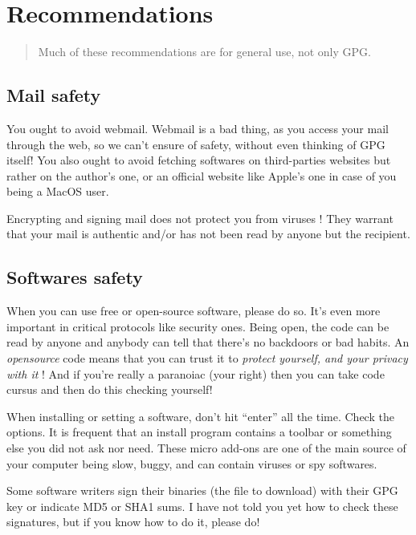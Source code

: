 \section{Recommendations}\label{recommendations}

\begin{quote}
Much of these recommendations are for general use, not only GPG.
\end{quote}

\subsection{Mail safety}

You ought to avoid webmail. Webmail is a bad thing, as you access your mail through the web, so we can't ensure of safety, without even
thinking of GPG itself! You also ought to avoid fetching softwares on third-parties websites but rather on the author's one, or an official website like Apple's one in case of you being a MacOS user.

Encrypting and signing mail does not protect you from viruses ! They
warrant that your mail is authentic and/or has not been read by anyone
but the recipient.

\subsection{Softwares safety}

When you can use free or open-source software, please do so. It's even more important in critical protocols like security ones. Being open, the code can be read by anyone and anybody can tell that there's no backdoors or bad habits. An \emph{opensource} code means that you can trust it to \emph{protect yourself, and your privacy with it} ! And if you're really a paranoiac (your right) then you can take code cursus and then do this checking yourself!

When installing or setting a software, don't hit ``enter'' all the time. Check the options. It is frequent that an install program contains a
toolbar or something else you did not ask nor need. These micro add-ons are one of the main source of your computer being slow, buggy, and can contain viruses or spy softwares.

Some software writers sign their binaries (the file to download) with their GPG key or indicate MD5 or SHA1 sums. I have not told you yet how to check these signatures, but if you know how to do it, please do!

